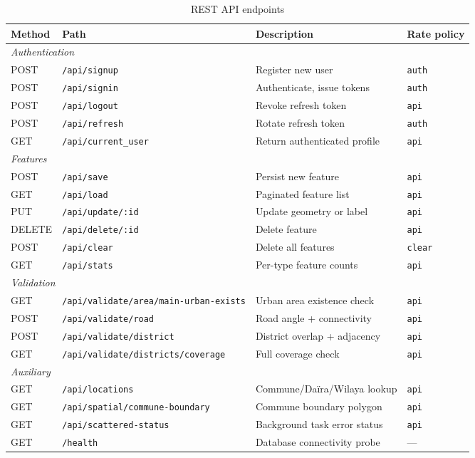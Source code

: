 \documentclass[12pt,a4paper]{article}
\theoremstyle{definition}
\theoremstyle{plain}
\theoremstyle{remark}
\begin{document}
\begin{table}[H]
\centering
\caption{REST API endpoints}
\label{tab:api_endpoints}
\begin{tabularx}{\textwidth}{llXl}
\toprule
\textbf{Method} & \textbf{Path} & \textbf{Description} & \textbf{Rate policy} \\
\midrule
\multicolumn{4}{l}{\textit{Authentication}} \\
POST & \texttt{/api/signup}        & Register new user            & \texttt{auth} \\
POST & \texttt{/api/signin}        & Authenticate, issue tokens   & \texttt{auth} \\
POST & \texttt{/api/logout}        & Revoke refresh token         & \texttt{api}  \\
POST & \texttt{/api/refresh}       & Rotate refresh token         & \texttt{auth} \\
GET  & \texttt{/api/current\_user} & Return authenticated profile & \texttt{api}  \\
\midrule
\multicolumn{4}{l}{\textit{Features}} \\
POST   & \texttt{/api/save}            & Persist new feature          & \texttt{api} \\
GET    & \texttt{/api/load}            & Paginated feature list        & \texttt{api} \\
PUT    & \texttt{/api/update/:id}      & Update geometry or label      & \texttt{api} \\
DELETE & \texttt{/api/delete/:id}      & Delete feature                & \texttt{api} \\
POST   & \texttt{/api/clear}           & Delete all features           & \texttt{clear} \\
GET    & \texttt{/api/stats}           & Per-type feature counts       & \texttt{api} \\
\midrule
\multicolumn{4}{l}{\textit{Validation}} \\
GET  & \texttt{/api/validate/area/main-urban-exists} & Urban area existence check & \texttt{api} \\
POST & \texttt{/api/validate/road}                   & Road angle + connectivity  & \texttt{api} \\
POST & \texttt{/api/validate/district}               & District overlap + adjacency & \texttt{api} \\
GET  & \texttt{/api/validate/districts/coverage}     & Full coverage check        & \texttt{api} \\
\midrule
\multicolumn{4}{l}{\textit{Auxiliary}} \\
GET & \texttt{/api/locations}        & Commune/Daïra/Wilaya lookup  & \texttt{api} \\
GET & \texttt{/api/spatial/commune-boundary} & Commune boundary polygon & \texttt{api} \\
GET & \texttt{/api/scattered-status} & Background task error status & \texttt{api} \\
GET & \texttt{/health}               & Database connectivity probe  & --- \\
\bottomrule
\end{tabularx}
\end{table}
\end{document}
